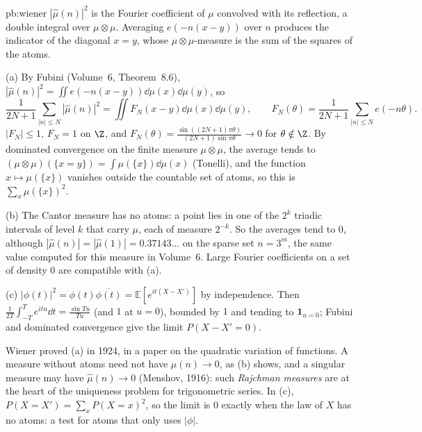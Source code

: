\begin{solution}{pb:wiener}
\idea $|\hat\mu(n)|^2$ is the Fourier coefficient of $\mu$ convolved with its reflection, a double integral over $\mu\otimes\mu$. Averaging $e(-n(x-y))$ over $n$ produces the indicator of the diagonal
$x=y$, whose $\mu\otimes\mu$-measure is the sum of the squares of the atoms.

\writeup (a) By Fubini (Volume~6, Theorem~8.6), $|\hat\mu(n)|^2=\iint e(-n(x-y))\dd\mu(x)\dd\mu(y)$, so
\[
\frac1{2N+1}\sum_{|n|\le N}|\hat\mu(n)|^2=\iint F_N(x-y)\dd\mu(x)\dd\mu(y),\qquad F_N(\theta)=\frac1{2N+1}\sum_{|n|\le N}e(-n\theta).
\]
$|F_N|\le1$, $F_N=1$ on $\Z$, and $F_N(\theta)=\frac{\sin((2N+1)\pi\theta)}{(2N+1)\sin\pi\theta}\to0$ for $\theta\notin\Z$. By dominated convergence on the finite measure $\mu\otimes\mu$, the average
tends to $(\mu\otimes\mu)(\{x=y\})=\int\mu(\{x\})\dd\mu(x)$ (Tonelli), and the function $x\mapsto\mu(\{x\})$ vanishes outside the countable set of atoms, so this is $\sum_x\mu(\{x\})^2$.

(b) The Cantor measure has no atoms: a point lies in one of the $2^k$ triadic intervals of level $k$ that carry $\mu$, each of measure $2^{-k}$. So the averages tend to $0$, although
$|\hat\mu(n)|=|\hat\mu(1)|=0.37143\ldots$ on the sparse set $n=3^m$, the same value computed for this measure in Volume~6. Large Fourier coefficients on a set of density $0$ are compatible with (a).

(c) $|\phi(t)|^2=\phi(t)\overline{\phi(t)}=\mathbb E[e^{it(X-X')}]$ by independence. Then $\frac1{2T}\int_{-T}^Te^{itu}\dd t=\frac{\sin Tu}{Tu}$ (and $1$ at $u=0$), bounded by $1$ and tending to
$\mathbf 1_{u=0}$; Fubini and dominated convergence give the limit $P(X-X'=0)$.

\leads Wiener proved (a) in 1924, in a paper on the quadratic variation of functions. A measure without atoms need not have $\hat\mu(n)\to0$, as (b) shows, and a singular measure may
have $\hat\mu(n)\to0$ (Menshov, 1916): such \emph{Rajchman measures} are at the heart of the uniqueness problem for trigonometric series. In (c), $P(X=X')=\sum_xP(X=x)^2$, so the limit is $0$ exactly when the law of
$X$ has no atoms: a test for atoms that only uses $|\phi|$.
\end{solution}

